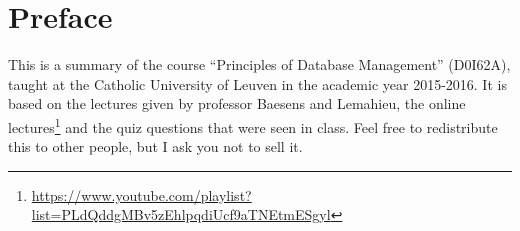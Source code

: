 \section*{Preface}
This is a summary of the course ``Principles of Database Management'' (D0I62A), taught at the Catholic University of Leuven in the academic year 2015-2016. It is based on the lectures given by professor Baesens and Lemahieu, the online lectures\footnote{\url{https://www.youtube.com/playlist?list=PLdQddgMBv5zEhlpqdiUcf9aTNEtmESgyl}} and the quiz questions that were seen in class. Feel free to redistribute this to other people, but I ask you not to sell it.
